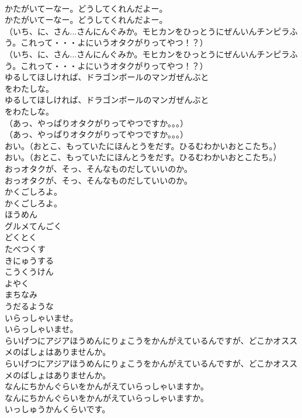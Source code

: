 \documentclass[8pt]{extreport}
\begin{document}
\begin{CJK}{UTF8}{min}
\\	かたがいてーなー。どうしてくれんだよー。
\\	かたがいてーなー。どうしてくれんだよー。
\\	（いち、に、さん...さんにんぐみか。モヒカンをひっとうにぜんいんチンピラふう。これって・・・よにいうオタクがりってやつ！？）
\\	（いち、に、さん...さんにんぐみか。モヒカンをひっとうにぜんいんチンピラふう。これって・・・よにいうオタクがりってやつ！？）
\\	ゆるしてほしければ、ドラゴンボールのマンガぜんぶと
\\	をわたしな。
\\	ゆるしてほしければ、ドラゴンボールのマンガぜんぶと
\\	をわたしな。
\\	（あっ、やっぱりオタクがりってやつですか。。。）
\\	（あっ、やっぱりオタクがりってやつですか。。。）
\\	おい。（おとこ、もっていたにほんとうをだす。ひるむわかいおとこたち。）
\\	おい。（おとこ、もっていたにほんとうをだす。ひるむわかいおとこたち。）
\\	おっオタクが、そっ、そんなものだしていいのか。
\\	おっオタクが、そっ、そんなものだしていいのか。
\\	かくごしろよ。
\\	かくごしろよ。
\\	ほうめん
\\	グルメてんごく
\\	どくとく
\\	たべつくす
\\	きにゅうする
\\	こうくうけん
\\	よやく
\\	まちなみ
\\	うだるような
\\	いらっしゃいませ。
\\	いらっしゃいませ。
\\	らいげつにアジアほうめんにりょこうをかんがえているんですが、どこかオススメのばしょはありませんか。
\\	らいげつにアジアほうめんにりょこうをかんがえているんですが、どこかオススメのばしょはありませんか。
\\	なんにちかんぐらいをかんがえていらっしゃいますか。
\\	なんにちかんぐらいをかんがえていらっしゃいますか。
\\	いっしゅうかんくらいです。

\end{CJK}
\end{document}
